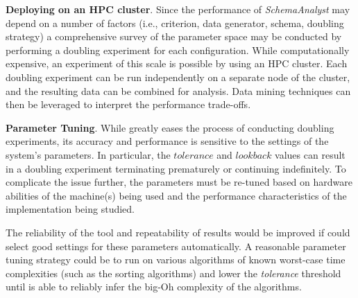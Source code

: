 
{\bf Deploying on an HPC cluster}.
Since the performance of \textit{SchemaAnalyst} may depend on a number
of factors (i.e., criterion, data generator, schema, doubling strategy) a
comprehensive survey of the parameter space may be conducted by
performing a doubling experiment for each configuration. While
computationally expensive, an experiment of this scale is possible by
using an HPC cluster. Each doubling experiment can be run independently
on a separate node of the cluster, and the resulting data can be combined
for analysis. Data mining techniques can then be leveraged to interpret
the performance trade-offs.


 {\bf Parameter Tuning}.
  While \toolname greatly eases the process of conducting
  doubling experiments, its accuracy and performance is
  sensitive to the settings of the system's parameters.  In particular,
  the $\mathit{tolerance}$ and $\mathit{lookback}$ values can result in
  a doubling experiment terminating prematurely or continuing
  indefinitely.
  To complicate the issue further, the parameters must be re-tuned based
  on hardware abilities of the machine(s) being used and the performance
  characteristics of the implementation being studied.

  The reliability of the tool and repeatability of results would be
  improved if \toolname could select good settings for these
  parameters automatically. A reasonable parameter tuning strategy could
  be to run \toolname on various algorithms of known worst-case
  time complexities (such as the sorting algorithms) and lower the
  \textit{tolerance} threshold until \toolname is able to reliably 
  infer the big-Oh complexity of the algorithms.

